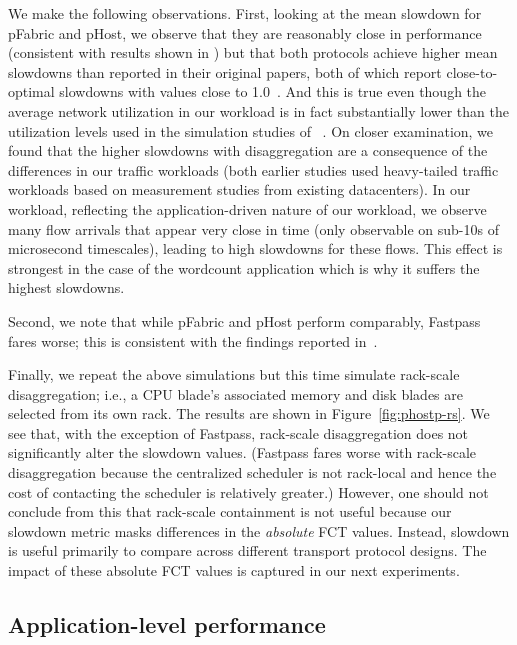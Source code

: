 We make the following observations. 
First, looking at the mean slowdown for pFabric and pHost, we observe that they are reasonably close in performance (consistent with results shown in \cite{phost}) but that both protocols achieve higher mean slowdowns than reported 
in their original papers, both of which report close-to-optimal slowdowns with values close to 1.0~\cite{phost,pfabric}. And this is true even though the average network utilization in our \dis workload is in fact substantially lower than the utilization levels used in the simulation studies of ~\cite{pfabric, phost}. 
On closer examination, we found that the higher slowdowns with disaggregation are a consequence of the differences in our traffic workloads (both earlier studies used heavy-tailed traffic workloads based on measurement 
studies from existing datacenters). In our \dis workload, reflecting the 
application-driven nature of our workload, we observe many flow arrivals that 
appear very close in time (only observable on sub-10s of microsecond timescales), leading to high slowdowns for these flows. This effect is strongest in the case of the wordcount application which is why it suffers the highest slowdowns. 

Second, we note that while pFabric and pHost perform comparably, Fastpass fares worse; this is consistent with the findings reported in~\cite{phost}.

Finally, we  repeat the above simulations but this time simulate rack-scale 
disaggregation; i.e., a CPU blade's associated memory and disk blades are selected from 
its own rack. The results are shown in Figure~\ref{fig:phostp-rs}. We see that, with the exception of Fastpass, rack-scale disaggregation does not significantly alter the slowdown values. (Fastpass fares worse with rack-scale disaggregation because the centralized scheduler is not rack-local and hence the cost of contacting the scheduler is relatively greater.)
However, one should not conclude from this that rack-scale containment is not useful because our slowdown metric masks differences in the \emph{absolute} FCT values. Instead, slowdown is useful primarily to compare across different transport protocol designs. The impact of these absolute FCT values is captured in our next experiments.

\subsection{Application-level performance}
\label{ssec:alp}

